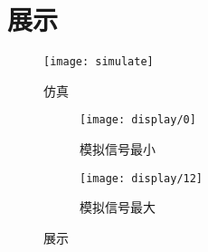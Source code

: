 \documentclass[../main]{subfiles}
\begin{document}
\chapter{展示}%
\label{cha:display}

\begin{figure}[htbp]
  \centering
  \texttt{[image: simulate]}
  \caption{仿真}%
  \label{fig:simulate}
\end{figure}

\begin{figure}[htbp]
  \centering
  \begin{subfigure}[htbp]{0.8\linewidth}
    \centering
    \texttt{[image: display/0]}
    \caption{模拟信号最小}%
    \label{fig:display/0}
  \end{subfigure}
  \quad
  \begin{subfigure}[htbp]{0.8\linewidth}
    \centering
    \texttt{[image: display/12]}
    \caption{模拟信号最大}%
    \label{fig:display/12}
  \end{subfigure}
  \caption{展示}%
  \label{fig:display}
\end{figure}
\end{document}
